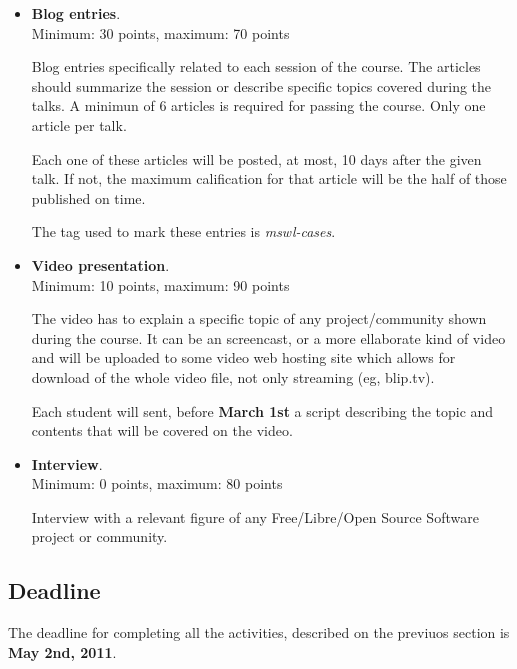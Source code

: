 \documentclass[a4paper]{article}
\begin{document}
\begin{itemize}

\item \textbf{Blog entries}. \\
  Minimum: 30 points, maximum: 70 points

  Blog entries specifically related to each session of the course. The articles 
should summarize the session or describe specific topics covered during the talks.
A minimun of 6 articles is required for passing the course. Only one article 
per talk. 

 Each one of these articles will be posted, at most, 10 days after the 
given talk. If not, the maximum calification for that article will be the half
of those published on time.
  
 The tag used to mark these entries is \textit{mswl-cases}.

\item \textbf{Video presentation}. \\
  Minimum: 10 points, maximum: 90 points 

  The video has to explain a specific topic of any project/community shown during the course. 
It can be an screencast, or a more ellaborate kind of video and will be uploaded 
to some video web hosting site which allows for download of the whole video file, 
not only streaming (eg, blip.tv).
  
  Each student will sent, before \textbf{March 1st} a script describing the topic and contents 
that will be covered on the video.

\item \textbf{Interview}. \\
  Minimum: 0 points, maximum: 80 points
  
  Interview with a relevant figure of any Free/Libre/Open Source Software project or community. 


\end{itemize}

\subsection{Deadline}

The deadline for completing all the activities, described on the previuos section is \textbf{May 2nd, 2011}.
\end{document}
